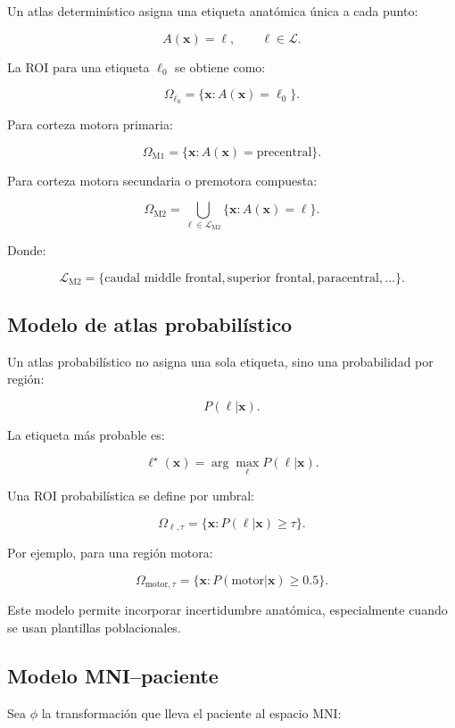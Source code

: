 \documentclass[12pt,a4paper]{article}
\begin{document}
Un atlas determinístico asigna una etiqueta anatómica única a cada punto:

\[
A(\mathbf{x})=\ell,
\qquad
\ell\in\mathcal{L}.
\]

La ROI para una etiqueta \(\ell_0\) se obtiene como:

\[
\Omega_{\ell_0}
=
\{\mathbf{x}:A(\mathbf{x})=\ell_0\}.
\]

Para corteza motora primaria:

\[
\Omega_{\text{M1}}
=
\{\mathbf{x}:A(\mathbf{x})=\text{precentral}\}.
\]

Para corteza motora secundaria o premotora compuesta:

\[
\Omega_{\text{M2}}
=
\bigcup_{\ell\in\mathcal{L}_{\text{M2}}}
\{\mathbf{x}:A(\mathbf{x})=\ell\}.
\]

Donde:

\[
\mathcal{L}_{\text{M2}}
=
\{\text{caudal middle frontal},
\text{superior frontal},
\text{paracentral},
\ldots\}.
\]

\subsection{Modelo de atlas probabilístico}

Un atlas probabilístico no asigna una sola etiqueta, sino una probabilidad por región:

\[
P(\ell|\mathbf{x}).
\]

La etiqueta más probable es:

\[
\ell^\star(\mathbf{x})
=
\arg\max_{\ell}
P(\ell|\mathbf{x}).
\]

Una ROI probabilística se define por umbral:

\[
\Omega_{\ell,\tau}
=
\{
\mathbf{x}:P(\ell|\mathbf{x})\geq \tau
\}.
\]

Por ejemplo, para una región motora:

\[
\Omega_{\text{motor},\tau}
=
\{
\mathbf{x}:P(\text{motor}|\mathbf{x})\geq 0.5
\}.
\]

Este modelo permite incorporar incertidumbre anatómica, especialmente cuando se usan plantillas poblacionales.

\subsection{Modelo MNI--paciente}

Sea \(\phi\) la transformación que lleva el paciente al espacio MNI:
\end{document}
